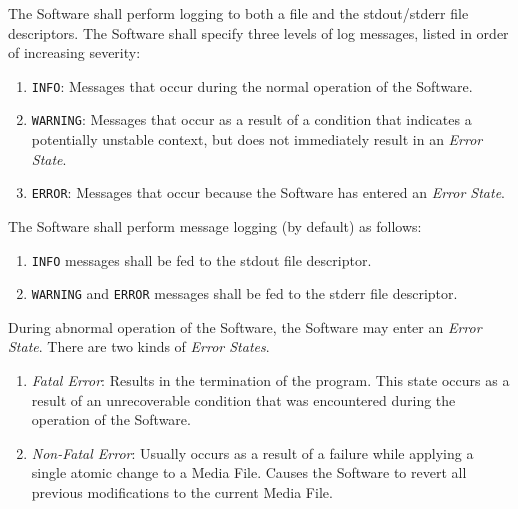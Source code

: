 \documentclass{designdoc}
\begin{document}
The Software shall perform logging to both a file and the stdout/stderr file
descriptors. The Software shall specify three levels of log messages, listed
in order of increasing severity:
\begin{enumerate}
\item \texttt{INFO}: Messages that occur during the normal operation of the
  Software.
\item \texttt{WARNING}: Messages that occur as a result of a condition that
  indicates a potentially unstable context, but does not immediately result
  in an \textit{Error State}.
\item \texttt{ERROR}: Messages that occur because the Software has entered an
  \textit{Error State}.
\end{enumerate}
The Software shall perform message logging (by default) as follows:
\begin{enumerate}
\item \texttt{INFO} messages shall be fed to the stdout file descriptor.
\item \texttt{WARNING} and \texttt{ERROR} messages shall be fed to the stderr
  file descriptor.
\end{enumerate}

During abnormal operation of the Software, the Software may enter an
\textit{Error State}. There are two kinds of \textit{Error States}.
\begin{enumerate}
\item \textit{Fatal Error}: Results in the termination of the program. This
  state occurs as a result of an unrecoverable condition that was encountered
  during the operation of the Software.
\item \textit{Non-Fatal Error}: Usually occurs as a result of a failure while
  applying a single atomic change to a Media File. Causes the Software to
  revert all previous modifications to the current Media File.
\end{enumerate}
\end{document}
